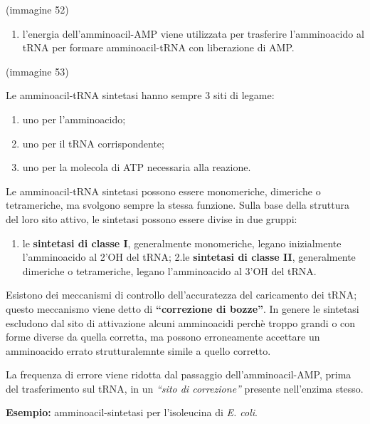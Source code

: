 \documentclass[11pt]{book}
\begin{document}
(immagine 52)

\begin{enumerate}
\def\labelenumi{\arabic{enumi}.}
\setcounter{enumi}{1}
\itemsep1pt\parskip0pt
\item
  l'energia dell'amminoacil-AMP viene utilizzata per trasferire
  l'amminoacido al tRNA per formare amminoacil-tRNA con liberazione di
  AMP.
\end{enumerate}

(immagine 53)

Le amminoacil-tRNA sintetasi hanno sempre 3 siti di legame:

\begin{enumerate}
\def\labelenumi{\arabic{enumi}.}
\itemsep1pt\parskip0pt
\item
  uno per l'amminoacido;
\item
  uno per il tRNA corrispondente;
\item
  uno per la molecola di ATP necessaria alla reazione.
\end{enumerate}

Le amminoacil-tRNA sintetasi possono essere monomeriche, dimeriche o
tetrameriche, ma svolgono sempre la stessa funzione. Sulla base della
struttura del loro sito attivo, le sintetasi possono essere divise in
due gruppi:

\begin{enumerate}
\def\labelenumi{\arabic{enumi}.}
\itemsep1pt\parskip0pt
\item
  le \textbf{sintetasi di classe I}, generalmente monomeriche, legano
  inizialmente l'amminoacido al 2'OH del tRNA; 2.le \textbf{sintetasi di
  classe II}, generalmente dimeriche o tetrameriche, legano
  l'amminoacido al 3'OH del tRNA.
\end{enumerate}

Esistono dei meccanismi di controllo dell'accuratezza del caricamento
dei tRNA; questo meccanismo viene detto di \textbf{``correzione di
bozze''}. In genere le sintetasi escludono dal sito di attivazione
alcuni amminoacidi perchè troppo grandi o con forme diverse da quella
corretta, ma possono erroneamente accettare un amminoacido errato
strutturalemnte simile a quello corretto.

La frequenza di errore viene ridotta dal passaggio dell'amminoacil-AMP,
prima del trasferimento sul tRNA, in un \emph{``sito di correzione''}
presente nell'enzima stesso.

\textbf{Esempio:} amminoacil-sintetasi per l'isoleucina di \emph{E.
coli}.
\end{document}
